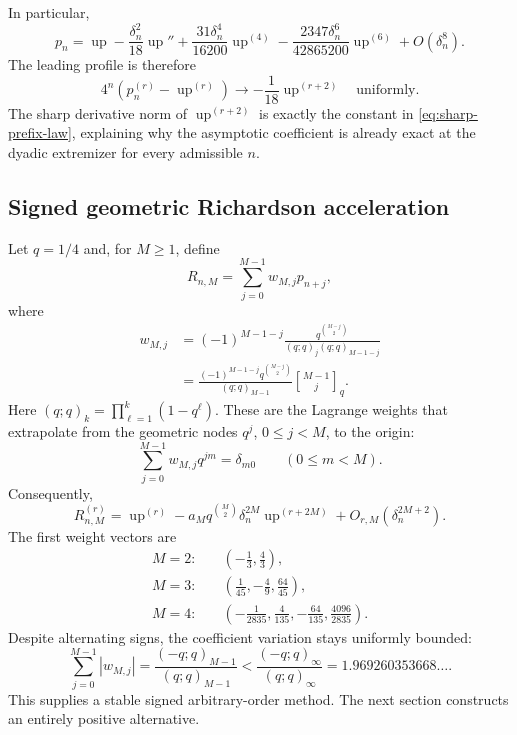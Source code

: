 \documentclass[11pt]{article}
\theoremstyle{definition}
\theoremstyle{remark}
\newcommand{\Up}{\operatorname{up}}
\newcommand{\qbinom}[3]{\genfrac{[}{]}{0pt}{}{#1}{#2}_{#3}}
\begin{document}
In particular,
\begin{equation}
 p_n=\Up-\frac{\delta_n^2}{18}\Up''
 +\frac{31\delta_n^4}{16200}\Up^{(4)}
 -\frac{2347\delta_n^6}{42865200}\Up^{(6)}
 +O(\delta_n^8).
 \label{eq:first-expansion}
\end{equation}
The leading profile is therefore
\begin{equation}
 4^n(p_n^{(r)}-\Up^{(r)})
 \longrightarrow-\frac1{18}\Up^{(r+2)}
 \quad\text{uniformly}.
 \label{eq:leading-profile}
\end{equation}
The sharp derivative norm of $\Up^{(r+2)}$ is exactly the constant in
\cref{eq:sharp-prefix-law}, explaining why the asymptotic coefficient is already exact
at the dyadic extremizer for every admissible $n$.

\subsection{Signed geometric Richardson acceleration}

Let $q=1/4$ and, for $M\ge1$, define
\begin{equation}
 R_{n,M}=\sum_{j=0}^{M-1}w_{M,j}p_{n+j},
 \label{eq:richardson-combination}
\end{equation}
where
\begin{equation}
\begin{aligned}
 w_{M,j}
 &=(-1)^{M-1-j}
 \frac{q^{\binom{M-j}{2}}}{(q;q)_j(q;q)_{M-1-j}}\\
 &=\frac{(-1)^{M-1-j}q^{\binom{M-j}{2}}}{(q;q)_{M-1}}
 \qbinom{M-1}{j}{q}.
\end{aligned}
 \label{eq:richardson-weights}
\end{equation}
Here $(q;q)_k=\prod_{\ell=1}^k(1-q^\ell)$.  These are the Lagrange weights that
extrapolate from the geometric nodes $q^j$, $0\le j<M$, to the origin:
\begin{equation}
 \sum_{j=0}^{M-1}w_{M,j}q^{jm}=\delta_{m0}
 \qquad(0\le m<M).
 \label{eq:richardson-moments}
\end{equation}
Consequently,
\begin{equation}
 R_{n,M}^{(r)}
 =\Up^{(r)}-a_Mq^{\binom M2}\delta_n^{2M}\Up^{(r+2M)}
 +O_{r,M}(\delta_n^{2M+2}).
 \label{eq:richardson-leading}
\end{equation}
The first weight vectors are
\begin{align*}
 M=2:&\quad\left(-\frac13,\frac43\right),\\
 M=3:&\quad\left(\frac1{45},-\frac49,\frac{64}{45}\right),\\
 M=4:&\quad\left(-\frac1{2835},\frac4{135},-\frac{64}{135},\frac{4096}{2835}\right).
\end{align*}
Despite alternating signs, the coefficient variation stays uniformly bounded:
\begin{equation}
 \sum_{j=0}^{M-1}|w_{M,j}|
 =\frac{(-q;q)_{M-1}}{(q;q)_{M-1}}
 <\frac{(-q;q)_\infty}{(q;q)_\infty}
 =1.969260353668\ldots.
 \label{eq:richardson-stability}
\end{equation}
This supplies a stable signed arbitrary-order method.  The next section constructs an
entirely positive alternative.
\end{document}
